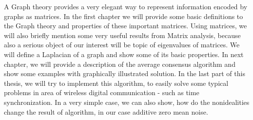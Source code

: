 A Graph theory provides a very elegant way to represent information encoded by graphs as matrices. In the first chapter we will provide some basic definitions to the Graph theory and properties of these important matrices. Using matrices, we will also briefly mention some very useful results from Matrix analysis, because also a serious object of our interest will be topic of eigenvalues of matrices. We will define a Laplacian of a graph and show some of its basic properties. In next chapter, we will provide a description of the average consensus algorithm and show some examples with graphically illustrated solution. In the last part of this thesis, we will try to implement this algorithm, to easily solve some typical problems in area of wireless digital communication - such as time synchronization. In a very simple case, we can also show, how do the nonidealities change the result of algorithm, in our case additive zero mean noise.


